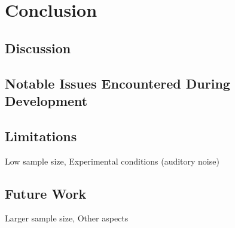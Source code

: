 \chapter{Conclusion}
\vspace{-1.6em}
%

\minitoc%
\thispagestyle{empty}
\newpage

\section{Discussion}

\section{Notable Issues Encountered During Development}

\section{Limitations}
Low sample size, Experimental conditions (auditory noise)

\section{Future Work}
Larger sample size, Other aspects
